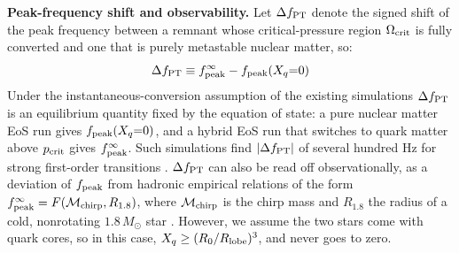 \documentclass[10pt,superscriptaddress,
amsmath,aps,prc,twocolumn,nofootinbib,floatfix]{revtex4-1}
\begin{document}
{\textbf{Peak-frequency shift and observability.}
Let $\Delta f_{\rm PT}$ denote the signed shift of the peak frequency between a remnant whose critical-pressure region $\Omega_{\rm crit}$ is fully converted and one that is purely metastable nuclear matter, so:
\begin{equation}
\Delta f_{\rm PT}\equiv f_{\rm peak}^{\infty}-f_{\rm peak}(X_q{=}0)
\label{eq:Delta_f_PT}
\end{equation}
Under the instantaneous-conversion assumption of the existing simulations $\Delta f_{\rm PT}$ is an equilibrium quantity fixed by the equation of state: a pure nuclear matter EoS run gives $f_{\rm peak}(X_q{=}0)$, and a hybrid EoS run that switches to quark matter above $p_{\rm crit}$ gives $f_{\rm peak}^{\infty}$.
Such simulations find $|\Delta f_{\rm PT}|$ of several hundred Hz for strong first-order transitions \cite{Bauswein:2018bma,Most:2018eaw,Weih:2019xvw,Prakash:2023afe}.
$\Delta f_{\rm PT}$ can also be read off observationally, as a deviation of $f_{\rm peak}$ from hadronic empirical relations of the form $f_{\rm peak}^{\infty}=F(\mathcal{M}_{\rm chirp},R_{1.8})$, where $\mathcal{M}_{\rm chirp}$ is the chirp mass and $R_{1.8}$ the radius of a cold, nonrotating $1.8\,M_\odot$ star \cite{Bauswein:2012ya,Vretinaris:2019spn}.
However, we assume the two stars come with quark cores, so in this case, $X_q\geq (R_0/R_{\rm lobe})^3$, and never goes to zero.

}
\end{document}

